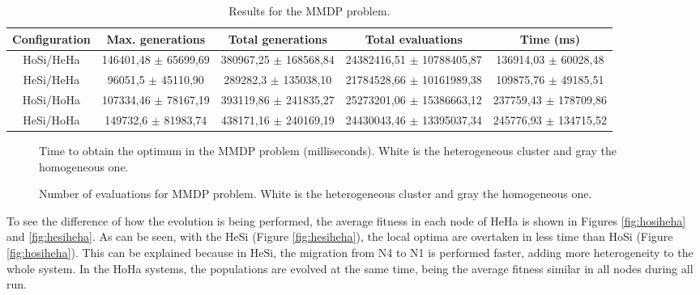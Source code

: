 \documentclass{sig-alternate}
\begin{document}
\begin{table*}
\centering
\caption{Results for the MMDP problem.}
\begin{tabular}{|c|c|c|c|c|} \hline
Configuration	& Max. generations			& Total generations			& 	Total evaluations			& Time (ms) \\ \hline
HoSi/HeHa		& 146401,48	$\pm$ 65699,69	& 380967,25	$\pm$ 168568,84	& 24382416,51 $\pm$	10788405,87	& 136914,03 $\pm$ 60028,48\\ \hline
HeSi/HeHa		& 96051,5	$\pm$ 45110,90	& 289282,3	$\pm$ 135038,10	& 21784528,66 $\pm$	10161989,38	& 109875,76 $\pm$ 49185,51\\ \hline \hline
HoSi/HoHa		& 107334,46 $\pm$ 78167,19  & 393119,86 $\pm$ 241835,27	& 25273201,06 $\pm$ 15386663,12	& 237759,43 $\pm$ 178709,86\\ \hline
HeSi/HoHa		& 149732,6 $\pm$ 81983,74	& 438171,16	$\pm$ 240169,19	& 24430043,46 $\pm$ 13395037,34	& 245776,93 $\pm$ 134715,52\\ \hline

\end{tabular}
\label{tab:resultsMMDP}
\end{table*}






\begin{figure}
\centering
{}
\caption{Time to obtain the optimum in the MMDP problem (milliseconds). White is the heterogeneous cluster and gray the homogeneous one.}
\label{fig:timeMMDP}
\end{figure}

\begin{figure}
\centering
{}
\caption{Number of evaluations for MMDP problem. White is the heterogeneous cluster and gray the homogeneous one.}
\label{fig:evalsMMDP}
\end{figure}

To see the difference of how the evolution is being performed, the average fitness in each node of HeHa is shown in Figures \ref{fig:hosiheha} and \ref{fig:hesiheha}. As can be seen, with the HeSi (Figure \ref{fig:hesiheha}), the local optima are overtaken in less time than HoSi (Figure \ref{fig:hosiheha}). This can be explained because in HeSi, the migration from N4 to N1 is performed faster, adding more heterogeneity to the whole system. In the HoHa systems, the populations are evolved at the same time, being the average fitness similar in all nodes during all run. %
\end{document}
